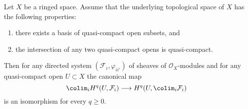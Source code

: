 \begin{lemma}
\label{lemma-quasi-separated-cohomology-colimit}
Let $X$ be a ringed space. Assume that the underlying topological space
of $X$ has the following properties:
\begin{enumerate}
\item there exists a basis of quasi-compact open subsets, and
\item the intersection of any two quasi-compact opens is quasi-compact.
\end{enumerate}
Then for any directed system $(\mathcal{F}_i, \varphi_{ii'})$
of sheaves of $\mathcal{O}_X$-modules and for any quasi-compact open
$U \subset X$ the canonical map
$$
\colim_i H^q(U, \mathcal{F}_i)
\longrightarrow
H^q(U, \colim_i \mathcal{F}_i)
$$
is an isomorphism for every $q \geq 0$.
\end{lemma}

